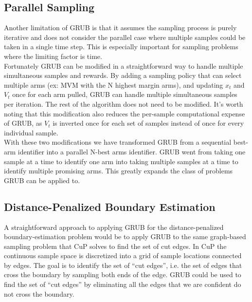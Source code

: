 \documentclass{article}[12pt]
\begin{document}
\subsection{Parallel Sampling}

Another limitation of GRUB is that it assumes the sampling process is purely iterative and does not consider the parallel case where multiple samples could be taken in a single time step.
This is especially important for sampling problems where the limiting factor is time. \\

Fortunately GRUB can be modified in a straightforward way to handle multiple simultaneous samples and rewards.
By adding a sampling policy that can select multiple arms (ex: MVM with the N highest margin arms), and updating $x_t$ and $V_t$ once for each arm pulled,
GRUB can handle multiple simultaneous samples per iteration.
The rest of the algorithm does not need to be modified.
It’s worth noting that this modification also reduces the per-sample computational expense of GRUB,
as $V_t$ is inverted once for each set of samples instead of once for every individual sample. \\

With these two modifications we have transformed GRUB from a sequential best-arm identifier into a parallel N-best arms identifier.
GRUB went from taking one sample at a time to identify one arm into taking multiple samples at a time to identify multiple promising arms.
This greatly expands the class of problems GRUB can be applied to.

\subsection{Distance-Penalized Boundary Estimation}

A straightforward approach to applying GRUB for the distance-penalized boundary-estimation problem would be to apply GRUB to the same graph-based sampling problem that CuP solves to find the set of cut edges.
In CuP the continuous sample space is discretized into a grid of sample locations connected by edges.
The goal is to identify the set of ``cut edges'', i.e. the set of edges that cross the boundary by sampling both ends of the edge.
GRUB could be used to find the set of ``cut edges'' by eliminating all the edges that we are confident do not cross the boundary. \\
\end{document}
